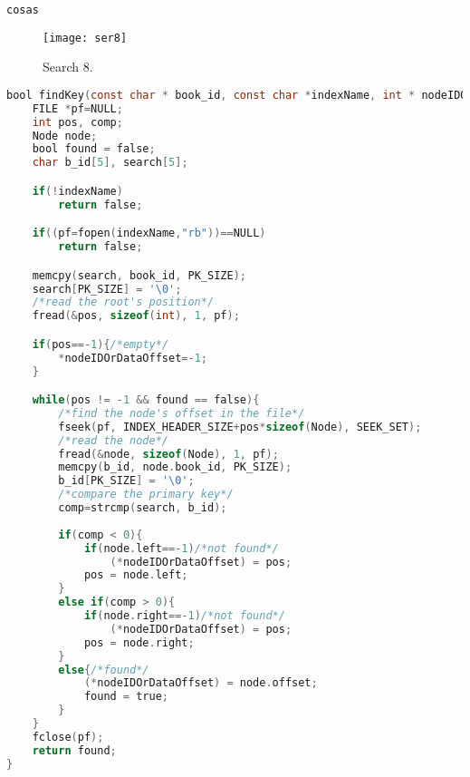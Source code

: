 \documentclass{article}
\begin{document}
\begin{lstlisting}[language=C, texcl=true, numbers=left]
\end{lstlisting}
\begin{Verbatim}[frame=single]
cosas
\end{Verbatim}
\begin{figure}[h]
\caption{Search 8.}
\bigskip
\texttt{[image: ser8]}
\centering
\label{fig:ser8}
\end{figure}
\usepackage{listings}
\usepackage{xcolor}



\lstset{style=mystyle}
\begin{lstlisting}[language=C]
bool findKey(const char * book_id, const char *indexName, int * nodeIDOrDataOffset){
    FILE *pf=NULL;
    int pos, comp;
    Node node;
    bool found = false;
    char b_id[5], search[5];

    if(!indexName)
        return false;

    if((pf=fopen(indexName,"rb"))==NULL)
        return false;

    memcpy(search, book_id, PK_SIZE);
    search[PK_SIZE] = '\0';
    /*read the root's position*/
    fread(&pos, sizeof(int), 1, pf);

    if(pos==-1){/*empty*/
        *nodeIDOrDataOffset=-1;
    }

    while(pos != -1 && found == false){
        /*find the node's offset in the file*/
        fseek(pf, INDEX_HEADER_SIZE+pos*sizeof(Node), SEEK_SET);
        /*read the node*/
        fread(&node, sizeof(Node), 1, pf);
        memcpy(b_id, node.book_id, PK_SIZE);
        b_id[PK_SIZE] = '\0';
        /*compare the primary key*/
        comp=strcmp(search, b_id);
        
        if(comp < 0){
            if(node.left==-1)/*not found*/
                (*nodeIDOrDataOffset) = pos;
            pos = node.left;            
        }
        else if(comp > 0){
            if(node.right==-1)/*not found*/
                (*nodeIDOrDataOffset) = pos;
            pos = node.right;            
        }
        else{/*found*/
            (*nodeIDOrDataOffset) = node.offset;
            found = true;
        }
    }
    fclose(pf);
    return found;
}

\end{lstlisting}
\end{document}

